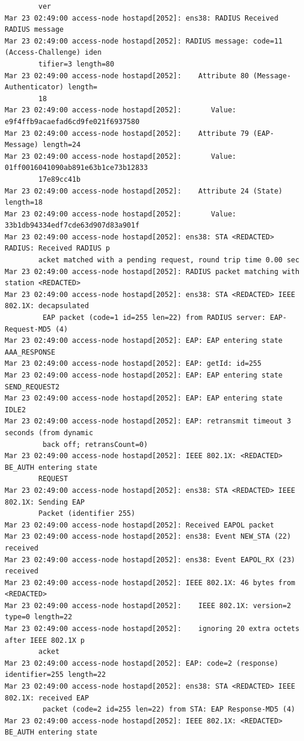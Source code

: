 \documentclass[11pt]{article}
\begin{document}
\begin{verbatim}
        ver
Mar 23 02:49:00 access-node hostapd[2052]: ens38: RADIUS Received RADIUS message
Mar 23 02:49:00 access-node hostapd[2052]: RADIUS message: code=11 (Access-Challenge) iden
        tifier=3 length=80
Mar 23 02:49:00 access-node hostapd[2052]:    Attribute 80 (Message-Authenticator) length=
        18
Mar 23 02:49:00 access-node hostapd[2052]:       Value: e9f4ffb9acaefad6cd9fe021f6937580
Mar 23 02:49:00 access-node hostapd[2052]:    Attribute 79 (EAP-Message) length=24
Mar 23 02:49:00 access-node hostapd[2052]:       Value: 01ff0016041090ab891e63b1ce73b12833
        17e89cc41b
Mar 23 02:49:00 access-node hostapd[2052]:    Attribute 24 (State) length=18
Mar 23 02:49:00 access-node hostapd[2052]:       Value: 33b1db94334edf7cde63d907d83a901f
Mar 23 02:49:00 access-node hostapd[2052]: ens38: STA <REDACTED> RADIUS: Received RADIUS p
        acket matched with a pending request, round trip time 0.00 sec
Mar 23 02:49:00 access-node hostapd[2052]: RADIUS packet matching with station <REDACTED>
Mar 23 02:49:00 access-node hostapd[2052]: ens38: STA <REDACTED> IEEE 802.1X: decapsulated
         EAP packet (code=1 id=255 len=22) from RADIUS server: EAP-Request-MD5 (4)
Mar 23 02:49:00 access-node hostapd[2052]: EAP: EAP entering state AAA_RESPONSE
Mar 23 02:49:00 access-node hostapd[2052]: EAP: getId: id=255
Mar 23 02:49:00 access-node hostapd[2052]: EAP: EAP entering state SEND_REQUEST2
Mar 23 02:49:00 access-node hostapd[2052]: EAP: EAP entering state IDLE2
Mar 23 02:49:00 access-node hostapd[2052]: EAP: retransmit timeout 3 seconds (from dynamic
         back off; retransCount=0)
Mar 23 02:49:00 access-node hostapd[2052]: IEEE 802.1X: <REDACTED> BE_AUTH entering state 
        REQUEST
Mar 23 02:49:00 access-node hostapd[2052]: ens38: STA <REDACTED> IEEE 802.1X: Sending EAP 
        Packet (identifier 255)
Mar 23 02:49:00 access-node hostapd[2052]: Received EAPOL packet
Mar 23 02:49:00 access-node hostapd[2052]: ens38: Event NEW_STA (22) received
Mar 23 02:49:00 access-node hostapd[2052]: ens38: Event EAPOL_RX (23) received
Mar 23 02:49:00 access-node hostapd[2052]: IEEE 802.1X: 46 bytes from <REDACTED>
Mar 23 02:49:00 access-node hostapd[2052]:    IEEE 802.1X: version=2 type=0 length=22
Mar 23 02:49:00 access-node hostapd[2052]:    ignoring 20 extra octets after IEEE 802.1X p
        acket
Mar 23 02:49:00 access-node hostapd[2052]: EAP: code=2 (response) identifier=255 length=22
Mar 23 02:49:00 access-node hostapd[2052]: ens38: STA <REDACTED> IEEE 802.1X: received EAP
         packet (code=2 id=255 len=22) from STA: EAP Response-MD5 (4)
Mar 23 02:49:00 access-node hostapd[2052]: IEEE 802.1X: <REDACTED> BE_AUTH entering state 

\end{verbatim}
\end{document}
